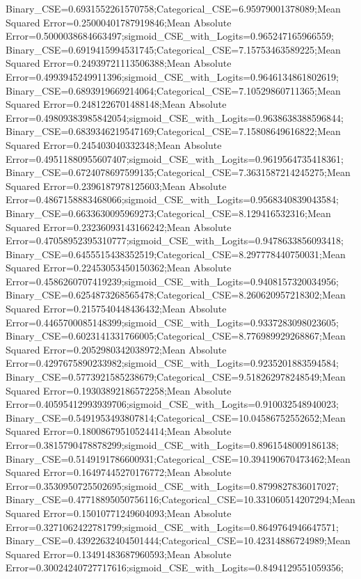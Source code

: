 Binary_CSE=0.6931552261570758;Categorical_CSE=6.95979001378089;Mean Squared Error=0.25000401787919846;Mean Absolute Error=0.5000038684663497;sigmoid_CSE_with_Logits=0.965247165966559;
Binary_CSE=0.6919415994531745;Categorical_CSE=7.15753463589225;Mean Squared Error=0.24939721113506388;Mean Absolute Error=0.4993945249911396;sigmoid_CSE_with_Logits=0.9646134861802619;
Binary_CSE=0.6893919669214064;Categorical_CSE=7.10529860711365;Mean Squared Error=0.2481226701488148;Mean Absolute Error=0.49809383985842054;sigmoid_CSE_with_Logits=0.9638638388596844;
Binary_CSE=0.6839346219547169;Categorical_CSE=7.15808649616822;Mean Squared Error=0.245403040332348;Mean Absolute Error=0.49511880955607407;sigmoid_CSE_with_Logits=0.9619564735418361;
Binary_CSE=0.6724078697599135;Categorical_CSE=7.3631587214245275;Mean Squared Error=0.2396187978125603;Mean Absolute Error=0.4867158883468066;sigmoid_CSE_with_Logits=0.9568340839043584;
Binary_CSE=0.6633630095969273;Categorical_CSE=8.129416532316;Mean Squared Error=0.23236093143166242;Mean Absolute Error=0.47058952395310777;sigmoid_CSE_with_Logits=0.9478633856093418;
Binary_CSE=0.6455515438352519;Categorical_CSE=8.297778440750031;Mean Squared Error=0.22453053450150362;Mean Absolute Error=0.4586260707419239;sigmoid_CSE_with_Logits=0.9408157320034956;
Binary_CSE=0.6254873268565478;Categorical_CSE=8.260620957218302;Mean Squared Error=0.2157540448436432;Mean Absolute Error=0.4465700085148399;sigmoid_CSE_with_Logits=0.9337283098023605;
Binary_CSE=0.6023141331766005;Categorical_CSE=8.776989929268867;Mean Squared Error=0.2052980342038972;Mean Absolute Error=0.4297675890233982;sigmoid_CSE_with_Logits=0.9235201883594584;
Binary_CSE=0.5773921585238679;Categorical_CSE=9.518262978248549;Mean Squared Error=0.19303892186572258;Mean Absolute Error=0.40595412993939706;sigmoid_CSE_with_Logits=0.910032548940023;
Binary_CSE=0.5491953493807814;Categorical_CSE=10.04586752552652;Mean Squared Error=0.18008679510524414;Mean Absolute Error=0.3815790478878299;sigmoid_CSE_with_Logits=0.8961548009186138;
Binary_CSE=0.5149191786600931;Categorical_CSE=10.394190670473462;Mean Squared Error=0.16497445270176772;Mean Absolute Error=0.3530950725502695;sigmoid_CSE_with_Logits=0.8799827836017027;
Binary_CSE=0.47718895050756116;Categorical_CSE=10.331060514207294;Mean Squared Error=0.15010771249604093;Mean Absolute Error=0.3271062422781799;sigmoid_CSE_with_Logits=0.8649764946647571;
Binary_CSE=0.43922632404501444;Categorical_CSE=10.42314886724989;Mean Squared Error=0.13491483687960593;Mean Absolute Error=0.30024240727717616;sigmoid_CSE_with_Logits=0.8494129551059356;
